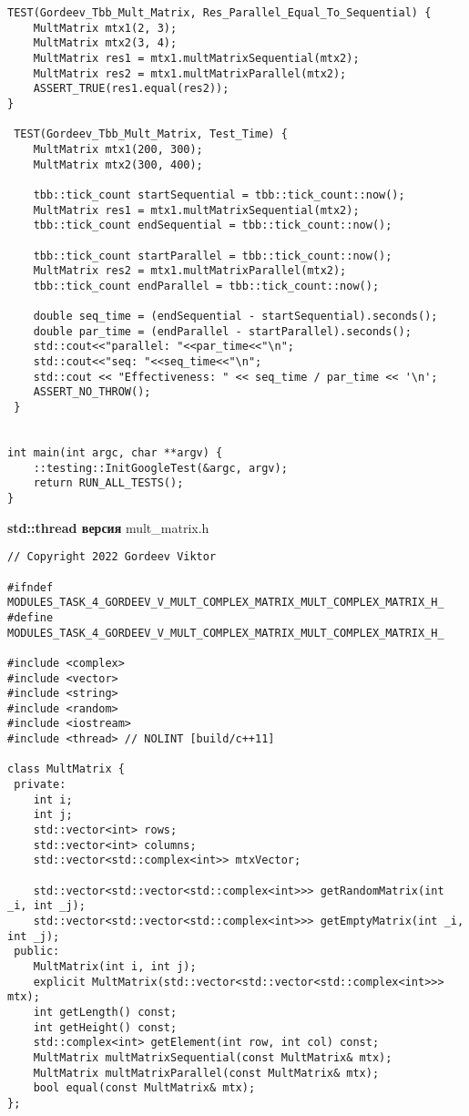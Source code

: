 \documentclass{report}
\begin{document}
\begin{enumerate}
\begin{lstlisting}
TEST(Gordeev_Tbb_Mult_Matrix, Res_Parallel_Equal_To_Sequential) {
    MultMatrix mtx1(2, 3);
    MultMatrix mtx2(3, 4);
    MultMatrix res1 = mtx1.multMatrixSequential(mtx2);
    MultMatrix res2 = mtx1.multMatrixParallel(mtx2);
    ASSERT_TRUE(res1.equal(res2));
}

 TEST(Gordeev_Tbb_Mult_Matrix, Test_Time) {
    MultMatrix mtx1(200, 300);
    MultMatrix mtx2(300, 400);

    tbb::tick_count startSequential = tbb::tick_count::now();
    MultMatrix res1 = mtx1.multMatrixSequential(mtx2);
    tbb::tick_count endSequential = tbb::tick_count::now();

    tbb::tick_count startParallel = tbb::tick_count::now();
    MultMatrix res2 = mtx1.multMatrixParallel(mtx2);
    tbb::tick_count endParallel = tbb::tick_count::now();

    double seq_time = (endSequential - startSequential).seconds();
    double par_time = (endParallel - startParallel).seconds();
    std::cout<<"parallel: "<<par_time<<"\n";
    std::cout<<"seq: "<<seq_time<<"\n";
    std::cout << "Effectiveness: " << seq_time / par_time << '\n';
    ASSERT_NO_THROW();
 }


int main(int argc, char **argv) {
    ::testing::InitGoogleTest(&argc, argv);
    return RUN_ALL_TESTS();
}

\end{lstlisting}

\textbf{std::thread версия}
\newline
\newline mult_matrix.h
\begin{lstlisting}
// Copyright 2022 Gordeev Viktor

#ifndef MODULES_TASK_4_GORDEEV_V_MULT_COMPLEX_MATRIX_MULT_COMPLEX_MATRIX_H_
#define MODULES_TASK_4_GORDEEV_V_MULT_COMPLEX_MATRIX_MULT_COMPLEX_MATRIX_H_

#include <complex>
#include <vector>
#include <string>
#include <random>
#include <iostream>
#include <thread> // NOLINT [build/c++11]

class MultMatrix {
 private:
    int i;
    int j;
    std::vector<int> rows;
    std::vector<int> columns;
    std::vector<std::complex<int>> mtxVector;

    std::vector<std::vector<std::complex<int>>> getRandomMatrix(int _i, int _j);
    std::vector<std::vector<std::complex<int>>> getEmptyMatrix(int _i, int _j);
 public:
    MultMatrix(int i, int j);
    explicit MultMatrix(std::vector<std::vector<std::complex<int>>> mtx);
    int getLength() const;
    int getHeight() const;
    std::complex<int> getElement(int row, int col) const;
    MultMatrix multMatrixSequential(const MultMatrix& mtx);
    MultMatrix multMatrixParallel(const MultMatrix& mtx);
    bool equal(const MultMatrix& mtx);
};


\end{lstlisting}
\end{enumerate}
\end{document}
